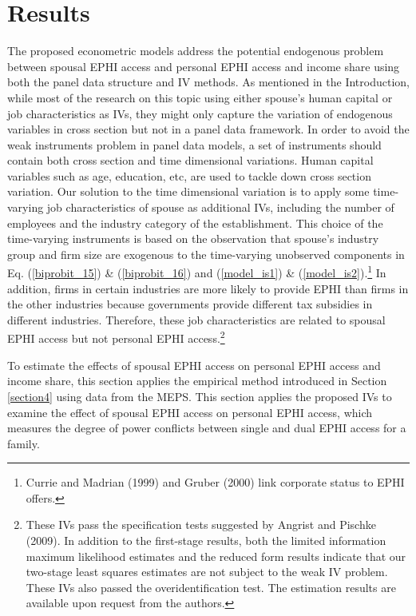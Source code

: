 \documentclass[legno,11pt]{article}
\begin{document}
\section{Results}\label{section5}
The proposed econometric models address the potential endogenous
problem between spousal EPHI access and personal EPHI access and
income share using both the panel data structure and IV methods. As
mentioned in the Introduction, while most of the research on this
topic using either spouse's human capital or job characteristics as
IVs, they might only capture the variation of endogenous variables
in cross section but not in a panel data framework. In order to
avoid the weak instruments problem in panel data models, a set of
instruments should contain both cross section and time dimensional
variations. Human capital variables such as age, education, etc, are
used to tackle down cross section variation. Our solution to the
time dimensional variation is to apply some time-varying job
characteristics of spouse as additional IVs, including the number of
employees and the industry category of the establishment. This
choice of the time-varying instruments is based on the observation
that spouse's industry group and firm size are exogenous to the
time-varying unobserved components in Eq. (\ref{biprobit_15}) \&
(\ref{biprobit_16}) and (\ref{model_is1}) \&
(\ref{model_is2}).\footnote{Currie and Madrian (1999) and Gruber
(2000) link corporate status to EPHI offers.} In addition, firms in
certain industries are more likely to provide EPHI than firms in the
other industries because governments provide different tax subsidies
in different industries. Therefore, these job characteristics are
related to spousal EPHI access but not personal EPHI
access.\footnote{These IVs pass the specification tests suggested by
Angrist and Pischke (2009). In addition to the first-stage results,
both the limited information maximum likelihood estimates and the
reduced form results indicate that our two-stage least squares
estimates are not subject to the weak IV problem. These IVs also
passed the overidentification test. The estimation results are
available upon request from the authors.}
\par
To estimate the effects of spousal EPHI access on personal EPHI
access and income share, this section applies the empirical method
introduced in Section \ref{section4} using data from the MEPS. This
section applies the proposed IVs to examine the effect of spousal
EPHI access on personal EPHI access, which measures the degree of
power conflicts between single and dual EPHI access for a family.
\end{document}
